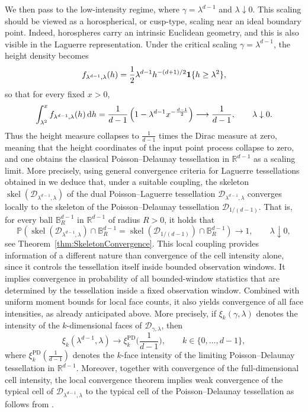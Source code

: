 \documentclass[11pt,a4paper]{article}
\theoremstyle{plain}
\theoremstyle{definition}
\theoremstyle{remark}
\newcommand{\dint}{\textup{d}}
\newcommand{\skel}{\mathop{\mathrm{skel}}\nolimits}
\def\BB{\mathbb{B}}
\def\PP{\mathbb{P}}
\def\RR{\mathbb{R}}
\def\cD{\mathcal{D}}
\begin{document}
We then pass to the low-intensity regime, where $\gamma=\lambda^{d-1}$ and $\lambda\downarrow0$.
This scaling should be viewed as a horospherical, or cusp-type, scaling near
an ideal boundary point. Indeed, horospheres carry an intrinsic Euclidean
geometry, and this is also visible in the Laguerre representation. Under the
critical scaling $\gamma=\lambda^{d-1}$, the height density becomes
\[
	f_{\lambda^{d-1},\lambda}(h)
	=
	\frac{1}{2}\lambda^{d-1}h^{-(d+1)/2}{\bf 1}\{h\ge\lambda^2\},
\]
so that for every fixed $x>0$,
\[
	\int_{\lambda^2}^x
	f_{\lambda^{d-1},\lambda}(h)\,\dint h
	=
	\frac{1}{d-1}
	\left(
	1-\lambda^{d-1}x^{-\frac{d-1}{2}}
	\right)
	\longrightarrow
	\frac{1}{d-1},
	\qquad \lambda\downarrow0.
\]
Thus the height measure collapses to $\frac{1}{d-1}$ times the Dirac measure at zero, meaning that the height coordinates of the input
point process collapse to zero, and one obtains the classical Poisson--Delaunay tessellation in
$\RR^{d-1}$ as a scaling limit. More precisely, using general convergence criteria for Laguerre tessellations obtained in \cite{GiWL26} we deduce that, under a suitable coupling, the skeleton
$\skel(\cD_{\lambda^{d-1},\lambda})$ of the dual Poisson--Laguerre
tessellation $\cD_{\lambda^{d-1},\lambda}$ converges locally to the
skeleton of the Poisson--Delaunay tessellation
$\cD_{1/(d-1)}$. That is, for every ball $\BB_R^{d-1}$ in $\RR^{d-1}$ of radius $R>0$, it holds that
\[
	\PP\left(
	\skel(\cD_{\lambda^{d-1},\lambda})\cap \BB_R^{d-1}
	=
	\skel(\cD_{1/(d-1)})\cap \BB_R^{d-1}
	\right)
	\longrightarrow 1,
	\qquad \lambda\downarrow0,
\]
see Theorem~\ref{thm:SkeletonConvergence}. This local coupling provides
information of a different nature than convergence of the cell intensity
alone, since it controls the tessellation itself inside bounded observation
windows. It implies convergence in probability of all bounded-window statistics that are determined by the tessellation inside a fixed
observation window. Combined with uniform moment bounds for local face
counts, it also yields convergence of all face intensities, as already anticipated above. More precisely,
if $\xi_k(\gamma,\lambda)$ denotes the intensity of the
$k$-dimensional faces of $\cD_{\gamma,\lambda}$, then
\[
	\xi_k(\lambda^{d-1},\lambda)
	\longrightarrow
	\xi_k^{\operatorname{PD}}\Big(\frac{1}{d-1}\Big),
	\qquad k\in\{0,\ldots,d-1\},
\]
where $\xi_k^{\operatorname{PD}}(\frac{1}{d-1})$ denotes the
$k$-face intensity of the limiting Poisson--Delaunay tessellation in
$\RR^{d-1}$. Moreover, together with convergence of the
full-dimensional cell intensity, the local convergence theorem implies weak convergence of the typical cell of
$\cD_{\lambda^{d-1},\lambda}$ to the typical cell of the
Poisson--Delaunay tessellation as follows from \cite{GKT24}.
\end{document}

